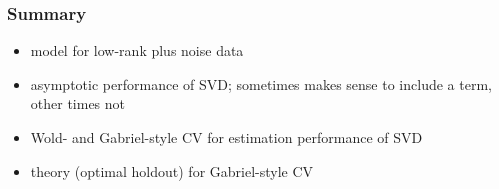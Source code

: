 \documentclass[14pt]{beamer}
\begin{document}
\begin{frame}
  \frametitle{Summary}
  \begin{itemize}
    \item model for low-rank plus noise data
    \item asymptotic performance of SVD; sometimes makes sense to include a term, other times not
    \item Wold- and Gabriel-style CV for estimation performance of SVD
    \item theory (optimal holdout) for Gabriel-style CV 
  \end{itemize}
\end{frame}
\end{document}

